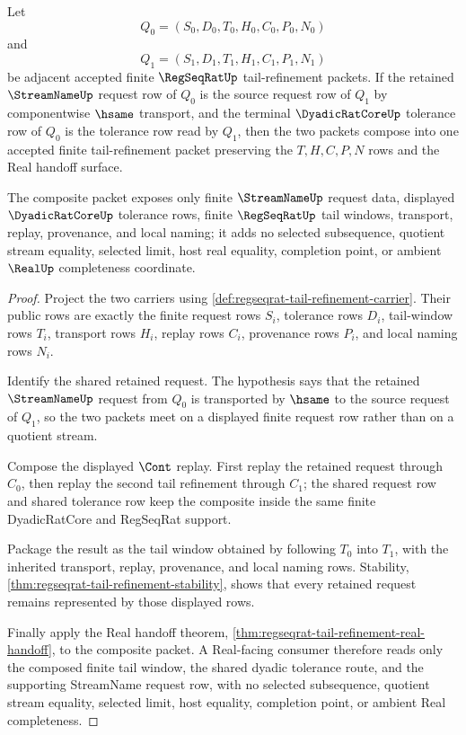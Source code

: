 \begin{theorem}
\label{thm:regseqrat-tail-refinement-composition}
Let
$$
Q_0=(S_0,D_0,T_0,H_0,C_0,P_0,N_0)
$$
and
$$
Q_1=(S_1,D_1,T_1,H_1,C_1,P_1,N_1)
$$
be adjacent accepted finite $\RegSeqRatUp$ tail-refinement packets. If the retained $\StreamNameUp$ request row of $Q_0$ is the source request row of $Q_1$ by componentwise $\hsame$ transport, and the terminal $\DyadicRatCoreUp$ tolerance row of $Q_0$ is the tolerance row read by $Q_1$, then the two packets compose into one accepted finite tail-refinement packet preserving the $T,H,C,P,N$ rows and the Real handoff surface.

The composite packet exposes only finite $\StreamNameUp$ request data, displayed $\DyadicRatCoreUp$ tolerance rows, finite $\RegSeqRatUp$ tail windows, transport, replay, provenance, and local naming; it adds no selected subsequence, quotient stream equality, selected limit, host real equality, completion point, or ambient $\RealUp$ completeness coordinate.
\end{theorem}
\begin{proof}
Project the two carriers using \autoref{def:regseqrat-tail-refinement-carrier}. Their public rows are exactly the finite request rows $S_i$, tolerance rows $D_i$, tail-window rows $T_i$, transport rows $H_i$, replay rows $C_i$, provenance rows $P_i$, and local naming rows $N_i$.

Identify the shared retained request. The hypothesis says that the retained $\StreamNameUp$ request from $Q_0$ is transported by $\hsame$ to the source request of $Q_1$, so the two packets meet on a displayed finite request row rather than on a quotient stream.

Compose the displayed $\Cont$ replay. First replay the retained request through $C_0$, then replay the second tail refinement through $C_1$; the shared request row and shared tolerance row keep the composite inside the same finite DyadicRatCore and RegSeqRat support.

Package the result as the tail window obtained by following $T_0$ into $T_1$, with the inherited transport, replay, provenance, and local naming rows. Stability, \autoref{thm:regseqrat-tail-refinement-stability}, shows that every retained request remains represented by those displayed rows.

Finally apply the Real handoff theorem, \autoref{thm:regseqrat-tail-refinement-real-handoff}, to the composite packet. A Real-facing consumer therefore reads only the composed finite tail window, the shared dyadic tolerance route, and the supporting StreamName request row, with no selected subsequence, quotient stream equality, selected limit, host equality, completion point, or ambient Real completeness.
\end{proof}
